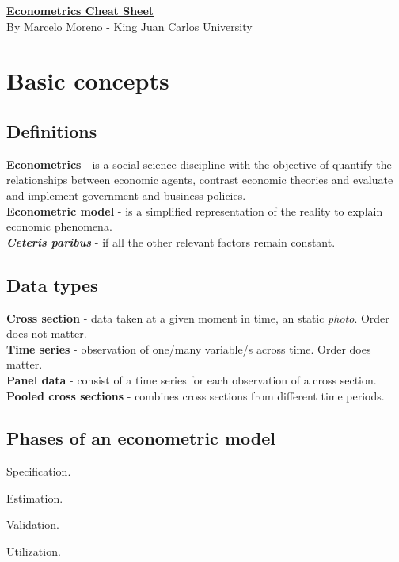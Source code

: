 \documentclass[10pt, a4paper, landscape]{extarticle}
\begin{document}
\setlength{\footskip}{12pt}

\begin{multicols}{3} %
\begin{center}
	\textbf{\LARGE \href{https://github.com/marcelomijas/econometrics-cheatsheet}{Econometrics Cheat Sheet}}
	\\ {\footnotesize By Marcelo Moreno - King Juan Carlos University}
\end{center}
\section*{Basic concepts}
	\subsection*{Definitions}
		\textbf{Econometrics} - is a social science discipline with the objective of quantify the relationships between economic agents, contrast economic theories and evaluate and implement government and business policies.
		\\ \textbf{Econometric model} - is a simplified representation of the reality to explain economic phenomena.
		\\ \textbf{\textsl{Ceteris paribus}} - if all the other relevant factors remain constant.
	\subsection*{Data types}
		\textbf{Cross section} - data taken at a given moment in time, an static \textsl{photo}. Order does not matter.
		\\ \textbf{Time series} - observation of one/many variable/s across time. Order does matter.
		\\ \textbf{Panel data} - consist of a time series for each observation of a cross section.
		\\ \textbf{Pooled cross sections} - combines cross sections from different time periods.
	\subsection*{Phases of an econometric model}
		\begin{enumerate}[leftmargin=*]
			\setlength{\multicolsep}{0pt}
		\end{enumerate}

\end{multicols}
\end{document}
